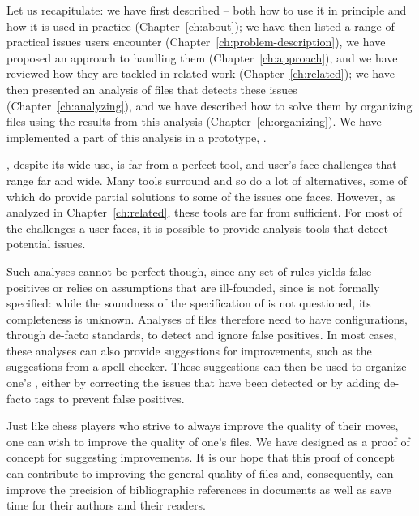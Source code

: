 
\noindent
Let us recapitulate: we have first described {\bibtex} -- both how to
use it in principle and how it is used in practice
(Chapter~\ref{ch:about}); we have then listed a range of practical
issues {\bibtex} users encounter
(Chapter~\ref{ch:problem-description}), we have proposed an approach
to hand\-ling them (Chapter~\ref{ch:approach}), and we have reviewed
how they are tackled in related work (Chapter~\ref{ch:related}); we
have then presented an analysis of {\bibtex} files that detects these
issues (Chapter~\ref{ch:analyzing}), and we have described how to
solve them by organizing {\bibtex} files using the results from this
analysis (Chapter~\ref{ch:organizing}).  We have implemented a part of
this analysis in a prototype, {\orangutan}.

{\bibtex}, despite its wide use, is far from a perfect tool, and
{\bibtex} user's face challenges that range far and wide.  Many tools
surround {\bibtex} and so do a lot of alternatives, some of which do
provide partial solutions to some of the issues one faces.  However,
as analyzed in Chapter~\ref{ch:related}, these tools are far from
sufficient.  For most of the challenges a {\bibtex} user faces, it is
possible to provide analysis tools that detect potential issues.

Such analyses cannot be perfect though, since any set of rules yields
false positives or relies on assumptions that are ill-founded, since
{\bibtex} is not formally specified: while the soundness of the
specification of {\bibtex} is not questioned, its completeness is
unknown.  Analyses of {\bibtex} files therefore need to have
configurations, through de-facto standards, to detect and ignore false
positives.  In most cases, these analyses can also provide suggestions
for improvements, such as the suggestions from a spell checker.  These
suggestions can then be used to organize one's , either by
correcting the issues that have been detected or by adding de-facto
tags to prevent false positives.

Just like chess players who strive to always improve the quality of
their moves, one can wish to improve the quality of one's {\bibtex}
files.  We have designed {\orangutan} as a proof of concept for
suggesting improvements.  It is our hope that this proof of concept
can contribute to improving the general quality of {\bibtex} files
and, consequently, can improve the precision of bibliographic
references in documents as well as save time for their authors and
their readers.